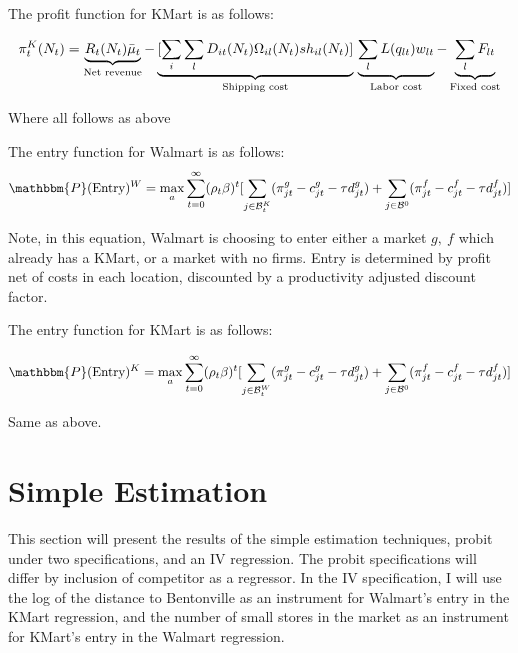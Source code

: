 \documentclass[11pt]{article}
\theoremstyle{definition}
\theoremstyle{remark}
\begin{document}
The profit function for KMart is as follows:

\begin{equation*}
  \pi_{t}^K(N_t) = \underbrace{R_t(N_t)\bar{\mu}_t}_{\text{Net revenue}} - \\
  \underbrace{[\sum_i\sum_lD_{it}(N_t)\Omega_{il}(N_t)sh_{il}(N_t)]}_{\text{Shipping cost}} \\
  \underbrace{\sum_l L(q_{lt})w_{lt}}_{\text{Labor cost}} -  \\
  \underbrace{\sum_lF_{lt}}_{\text{Fixed cost}}
\end{equation*}

Where all follows as above

The entry function for Walmart is as follows:
\begin{equation}
  \mathbbm{P}(\text{Entry})^W = \max_a\sum_{t=0}^{\infty}(\rho_t\beta)^t[\sum_{j\in\mathcal{B}_t^{K}}(\pi_{jt}^g - c_{jt}^g - \tau d_{jt}^g) + \sum_{j\in\mathcal{B}^{0}}(\pi_{jt}^f - c_{jt}^f - \tau d_{jt}^f)]
\end{equation}

Note, in this equation, Walmart is choosing to enter either a market $g, \ f$ which already has a KMart, or a market with no firms. Entry is determined by profit net of costs in each location, discounted by a productivity adjusted discount factor.

The entry function for KMart is as follows:

\begin{equation}
  \mathbbm{P}(\text{Entry})^K = \max_a\sum_{t=0}^{\infty}(\rho_t\beta)^t[\sum_{j\in\mathcal{B}_t^{W}}(\pi_{jt}^g - c_{jt}^g - \tau d_{jt}^g) + \sum_{j\in\mathcal{B}^{0}}(\pi_{jt}^f - c_{jt}^f - \tau d_{jt}^f)]
\end{equation}

Same as above.

\section{Simple Estimation}

This section will present the results of the simple estimation techniques, probit under two specifications, and an IV regression. The probit specifications will differ by inclusion of competitor as a regressor. In the IV specification, I will use the log of the distance to Bentonville as an instrument for Walmart's entry in the KMart regression, and the number of small stores in the market as an instrument for KMart's entry in the Walmart regression.
\end{document}
